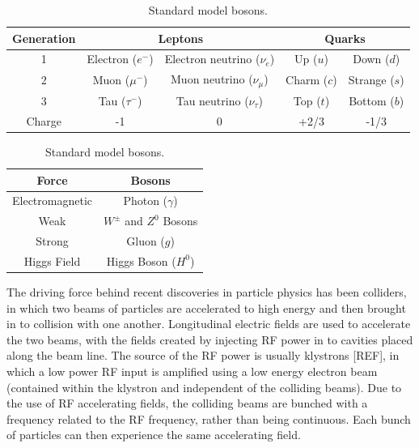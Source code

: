 \begin{table}
  \begin{center}
    \begin{tabular}{|c | c c | c c|}
	   \hline
       Generation & \multicolumn{2}{c|}{Leptons} & \multicolumn{2}{c|}{Quarks} \\
       \hline
       1 & Electron (\(e^-\)) & Electron neutrino (\(\nu_e\)) & Up (\(u\)) & Down (\(d\)) \\
       2 & Muon (\(\mu^-\)) & Muon neutrino (\(\nu_\mu\)) & Charm (\(c\)) & Strange (\(s\)) \\
       3 & Tau (\(\tau^-\)) & Tau neutrino (\(\nu_\tau\)) & Top (\(t\)) & Bottom (\(b\)) \\
	   \hline
	   Charge & -1 & 0 & +2/3 & -1/3 \\
	   \hline
    \end{tabular}
    \caption{Standard model fermions.}
  	\label{t:fermions}
  	\vspace{0.5 cm}
  	\begin{tabular}{| c c |}
	   \hline
       Force & Bosons \\
       \hline
       Electromagnetic & Photon (\(\gamma\)) \\
       Weak & \(W^{\pm}\) and \(Z^0\) Bosons \\
       Strong & Gluon (\(g\)) \\
	   \hline
	   Higgs Field & Higgs Boson (\(H^0\)) \\
	   \hline
    \end{tabular}
    \caption{Standard model bosons.}
  	\label{t:bosons}

  \end{center}
\end{table}


The driving force behind recent discoveries in particle physics has been colliders, in which two beams of particles are accelerated to high energy and then brought in to collision with one another. Longitudinal electric fields are used to accelerate the two beams, with the fields created by injecting RF power in to cavities placed along the beam line. The source of the RF power is usually klystrons [REF], in which a low power RF input is amplified using a low energy electron beam (contained within the klystron and independent of the colliding beams). Due to the use of RF accelerating fields, the colliding beams are bunched with a frequency related to the RF frequency, rather than being continuous. Each bunch of particles can then experience the same accelerating field.

